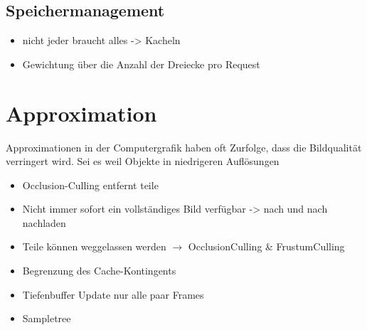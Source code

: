 \subsection{Speichermanagement}
\label{sec:basics:speichermanagement}
\begin{itemize}
 \item nicht jeder braucht alles -> Kacheln
 \item Gewichtung über die Anzahl der Dreiecke pro Request
\end{itemize}

\section{Approximation}
\label{sec:basics:approximation}
Approximationen in der Computergrafik haben oft  Zurfolge, dass die Bildqualität verringert wird. Sei es weil Objekte in niedrigeren Auflösungen
\begin{itemize}
 \item Occlusion-Culling entfernt teile
 \item Nicht immer sofort ein vollständiges Bild verfügbar -> nach und nach nachladen
 \item Teile können weggelassen werden $\rightarrow$ OcclusionCulling \& FrustumCulling
 \item Begrenzung des Cache-Kontingents
 \item Tiefenbuffer Update nur alle paar Frames
 \item Sampletree
\end{itemize}
